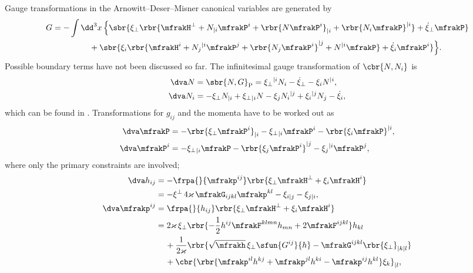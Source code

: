 \documentclass[a4paper,11pt]{article}
\begin{document}
Gauge transformations in the Arnowitt--Deser--Misner canonical variables are 
generated by 
\cite{Castellani1982} 
\begin{align}
G &= -\int\dd^3 x\,\Big\{ \sbr{
	\xi_\perp \rbr{
		\mfrakH^\perp + N_{|i} \mfrakP^i + \rbr{N\mfrakP^i}_{|i} + 
			\rbr{N_i \mfrakP}^{|i}} +
	\dot{\xi}_\perp \mfrakP}
	\nonumber \\ &\qquad\qquad\ \,+ \sbr{
	\xi_i \rbr{
		\mfrakH^i + N_j{}^{|i} \mfrakP^j + \rbr{N_j \mfrakP^i}^{|j} + N^{|i} 
\mfrakP} +
	\dot{\xi}_i \mfrakP^i} \Big\}.
\end{align}
Possible boundary terms have not been discussed so far. The infinitesimal gauge 
transformation of $\cbr{N, N_i}$ is
\begin{align}
\dva N &= \sbr{N, G}_\text{P} = 
\xi_\perp{}^{|i} N_i - \dot{\xi}_\perp - \xi_i N^{|i}, \\
\dva N_i &= %
- \xi_\perp N_{|i} + \xi_\perp{}_{|i} N
- \xi_j N_{i}{}^{|j} + \xi_i{}^{|j} N_j - \dot{\xi}_i,
\end{align}
which can be found in \cite{Kiriushcheva2008}. Transformations for 
$g_{ij}$ and the momenta have to be worked out as
\begin{align}
\dva \mfrakP &= -\rbr{\xi_\perp \mfrakP^i}_{|i} - \xi_\perp{}_{|i} \mfrakP^i
- \rbr{\xi_i \mfrakP}^{|i},\\
\dva \mfrakP^i &= -\xi_\perp{}_{|i} \mfrakP
- \rbr{\xi_j \mfrakP^i}^{|j} - \xi_j{}^{|i}\mfrakP^j,
\end{align}
where only the primary constraints are involved;
\begin{align}
\dva h_{ij} &= -\frpa{}{\mfrakp^{ij}}
\rbr{\xi_\perp \mfrakH^\perp + \xi_i \mfrakH^i}
\nonumber \\
&= -\xi^\perp\,4\varkappa\,\mfrakG_{ijkl}\mfrakp^{kl}
- \xi_{i|j} - \xi_{j|i}, \\
\dva \mfrakp^{ij} &= \frpa{}{h_{ij}}
\rbr{\xi_\perp \mfrakH^\perp + \xi_i \mfrakH^i}
\nonumber \\
&=
2\varkappa\,\xi_\perp\rbr{ -\frac{1}{2}h^{ij} \mfrakF^{klmn} h_{mn}
+ 2 \mfrakF^{ijkl}} h_{kl}
\nonumber \\
&\quad\,
+\frac{1}{2\varkappa}
\rbr{ \sqrt{\mfrakh}\,\xi_\perp\sfun{G^{ij}}{h}
-\mfrakG^{ijkl}\rbr{\xi_{\perp}}_{|k|l}}
\nonumber \\
&\quad\,
+\cbr{\rbr{\mfrakp^{il}h^{kj}+\mfrakp^{jl}h^{ki}
-\mfrakp^{ij}h^{kl}}\xi_k}_{|l},
\label{eq:var-mom}
\end{align}
\end{document}
